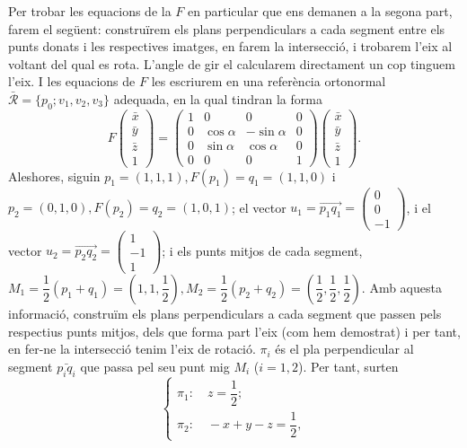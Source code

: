 \documentclass[10pt]{article}
\begin{document}
\begin{itemize}
Per trobar les equacions de la $F$ en particular que ens demanen a la segona part, farem el següent: construïrem els plans perpendiculars a cada segment entre els punts donats i les respectives imatges, en farem la intersecció, i trobarem l'eix al voltant del qual es rota. L'angle de gir el calcularem directament un cop tinguem l'eix. I les equacions de $F$ les escriurem en una referència ortonormal $\bar{\mathcal{R}}=\{p_0;v_1,v_2,v_3\}$ adequada, en la qual tindran la forma
\[
F\begin{pmatrix}
\bar{x}\\
\bar{y}\\
\bar{z}\\
1
\end{pmatrix}=\begin{pmatrix}
1 & 0 & 0 & 0\\
0 & \cos{\alpha} & -\sin{\alpha} & 0\\
0 & \sin{\alpha} & \cos{\alpha} & 0\\
0 & 0 & 0 & 1
\end{pmatrix}\begin{pmatrix}
\bar{x}\\
\bar{y}\\
\bar{z}\\
1
\end{pmatrix}.
\]
Aleshores, siguin $p_1=(1,1,1),F(p_1)=q_1=(1,1,0)$ i $p_2=(0,1,0),F(p_2)=q_2=(1,0,1)$; el vector $u_1=\vec{p_1q_1}=\begin{pmatrix}0\\ 0\\ -1\end{pmatrix}$, i el vector $u_2=\vec{p_2q_2}=\begin{pmatrix}1\\ -1\\ 1\end{pmatrix}$; i els punts mitjos de cada segment, $M_1=\dfrac{1}{2}(p_1+q_1)=\left(1,1,\dfrac{1}{2}\right),M_2=\dfrac{1}{2}(p_2+q_2)=\left(\dfrac{1}{2},\dfrac{1}{2},\dfrac{1}{2}\right)$. Amb aquesta informació, construïm els plans perpendiculars a cada segment que passen pels respectius punts mitjos, dels que forma part l'eix (com hem demostrat) i per tant, en fer-ne la intersecció tenim l'eix de rotació. $\pi_i$ és el pla perpendicular al segment $\bar{p_iq_i}$ que passa pel seu punt mig $M_i$ ($i=1,2$). Per tant, surten
\[
\begin{cases}
\pi_1:\quad z=\dfrac{1}{2};\\
\pi_2:\quad -x+y-z=\dfrac{1}{2},
\end{cases}
\]
\end{itemize}
\end{document}
